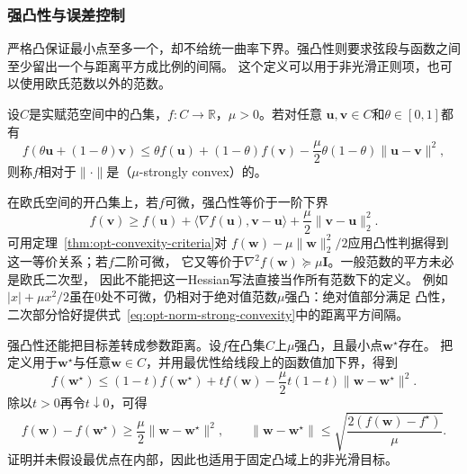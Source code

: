 \subsubsection{强凸性与误差控制}

严格凸保证最小点至多一个，却不给统一曲率下界。强凸性则要求弦段与函数之间至少留出一个与距离平方成比例的间隔。
这个定义可以用于非光滑正则项，也可以使用欧氏范数以外的范数。

\begin{definition}[相对于范数的强凸性]
\label{def:opt-strong-convexity}
设$C$是实赋范空间中的凸集，$f:C\to\mathbb{R}$，$\mu>0$。若对任意
$\bm{u},\bm{v}\in C$和$\theta\in[0,1]$都有
\begin{equation}
 f(\theta\bm{u}+(1-\theta)\bm{v})
 \leq\theta f(\bm{u})+(1-\theta)f(\bm{v})
 -\frac{\mu}{2}\theta(1-\theta)\lVert\bm{u}-\bm{v}\rVert^2,
 \label{eq:opt-norm-strong-convexity}
\end{equation}
则称$f$相对于$\lVert\cdot\rVert$是（$\mu$-strongly convex）的。
\end{definition}

在欧氏空间的开凸集上，若$f$可微，强凸性等价于一阶下界
\begin{equation}
  f(\bm{v})\geq f(\bm{u})+
  \langle\nabla f(\bm{u}),\bm{v}-\bm{u}\rangle
  +\frac{\mu}{2}\lVert\bm{v}-\bm{u}\rVert_2^2.
  \label{eq:opt-first-order-strong-convexity}
\end{equation}
可用定理~\ref{thm:opt-convexity-criteria}对
$f(\bm{w})-\mu\lVert\bm{w}\rVert_2^2/2$应用凸性判据得到这一等价关系；若$f$二阶可微，
它又等价于$\nabla^2f(\bm{w})\succeq\mu\bm{I}$。一般范数的平方未必是欧氏二次型，
因此不能把这一Hessian写法直接当作所有范数下的定义。
例如$|x|+\mu x^2/2$虽在$0$处不可微，仍相对于绝对值范数$\mu$强凸：绝对值部分满足
凸性，二次部分恰好提供式~\eqref{eq:opt-norm-strong-convexity}中的距离平方间隔。

强凸性还能把目标差转成参数距离。设$f$在凸集$C$上$\mu$强凸，且最小点$\bm w^\star$存在。
把定义用于$\bm w^\star$与任意$\bm w\in C$，并用最优性给线段上的函数值加下界，得到
\[
 f(\bm w^\star)\leq(1-t)f(\bm w^\star)+tf(\bm w)
 -\frac{\mu}{2}t(1-t)\|\bm w-\bm w^\star\|^2.
\]
除以$t>0$再令$t\downarrow0$，可得
\begin{equation}
 f(\bm w)-f(\bm w^\star)\geq\frac{\mu}{2}\|\bm w-\bm w^\star\|^2,
 \qquad
 \|\bm w-\bm w^\star\|\leq\sqrt{\frac{2(f(\bm w)-f^\star)}{\mu}}.
 \label{eq:opt-strong-convex-distance}
\end{equation}
证明并未假设最优点在内部，因此也适用于固定凸域上的非光滑目标。

